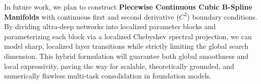 In future work, we plan to construct \textbf{Piecewise Continuous Cubic B-Spline Manifolds} with continuous first and second derivative ($C^2$) boundary conditions. By dividing ultra-deep networks into localized parameter blocks and parameterizing each block via a localized Chebyshev spectral projection, we can model sharp, localized layer transitions while strictly limiting the global search dimension. This hybrid formulation will guarantee both global smoothness and local expressivity, paving the way for scalable, theoretically grounded, and numerically flawless multi-task consolidation in foundation models.

